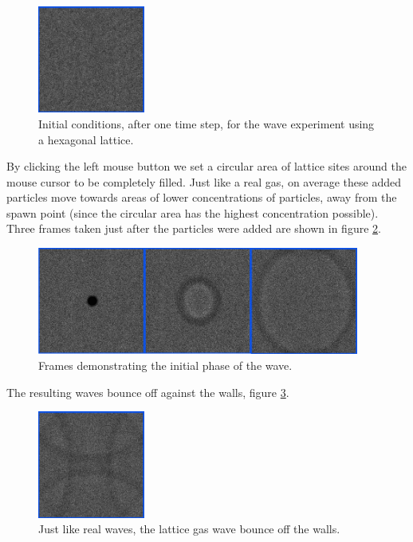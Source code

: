 \documentclass[12pt,a4paper]{article}
\begin{document}
\begin{figure}[htp]
\centering
  \includegraphics[width=100pt]{figs/hexwaveinit.png}
\caption{Initial conditions, after one time step, for the wave experiment using a hexagonal lattice.}
\label{hexwaveinit}
\end{figure}

By clicking the left mouse button we set a circular area of lattice sites around the mouse cursor to
be completely filled. Just like a real gas, on average these added particles move towards areas of lower
concentrations of particles, away from the spawn point (since the circular area has the highest concentration
possible). Three frames taken just after the particles were added are shown in figure \ref{hexwavestart}.

\begin{figure}[htp]
\centering
  \includegraphics[width=300pt]{figs/hexwavestart.png}
\caption{Frames demonstrating the initial phase of the wave.}
\label{hexwavestart}
\end{figure}


The resulting waves bounce off against the walls, figure \ref{hexwavebounce}.
\begin{figure}[htp]
\centering
  \includegraphics[width=100pt]{figs/hexwavebounce.png}
\caption{Just like real waves, the lattice gas wave bounce off the walls.}
\label{hexwavebounce}
\end{figure}
\end{document}
